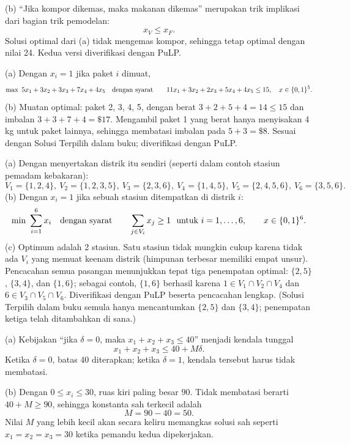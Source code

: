 (b) ``Jika kompor dikemas, maka makanan dikemas'' merupakan trik implikasi dari bagian trik pemodelan:
\[
x_V \leq x_F.
\]
Solusi optimal dari (a) tidak mengemas kompor, sehingga tetap optimal dengan nilai 24. Kedua versi diverifikasi dengan PuLP.


(a) Dengan $x_i = 1$ jika paket $i$ dimuat,
\[
\max\ 5x_1 + 3x_2 + 3x_3 + 7x_4 + 4x_5
\quad \mbox{dengan syarat}\quad \quad
11x_1 + 3x_2 + 2x_3 + 5x_4 + 4x_5 \leq 15,\quad x \in \{0,1\}^5.
\]
(b) Muatan optimal: paket 2, 3, 4, 5, dengan berat $3+2+5+4 = 14 \leq 15$ dan imbalan $3+3+7+4 = \$17$. Mengambil paket 1 yang berat hanya menyisakan 4\,kg untuk paket lainnya, sehingga membatasi imbalan pada $5+3 = \$8$. Sesuai dengan Solusi Terpilih dalam buku; diverifikasi dengan PuLP.


(a) Dengan menyertakan distrik itu sendiri (seperti dalam contoh stasiun pemadam kebakaran):
\[
V_1 = \{1,2,4\},\ V_2 = \{1,2,3,5\},\ V_3 = \{2,3,6\},\ V_4 = \{1,4,5\},\ V_5 = \{2,4,5,6\},\ V_6 = \{3,5,6\}.
\]
(b) Dengan $x_i = 1$ jika sebuah stasiun ditempatkan di distrik $i$:
\[
\min\ \sum_{i=1}^{6} x_i
\quad \mbox{dengan syarat}\quad \quad
\sum_{j \in V_i} x_j \geq 1 \ \mbox{ untuk } i = 1,\dots,6, \qquad x \in \{0,1\}^6.
\]
(c) Optimum adalah 2 stasiun. Satu stasiun tidak mungkin cukup karena tidak ada $V_i$ yang memuat keenam distrik (himpunan terbesar memiliki empat unsur). Pencacahan semua pasangan menunjukkan tepat tiga penempatan optimal: $\{2,5\}$, $\{3,4\}$, dan $\{1,6\}$; sebagai contoh, $\{1,6\}$ berhasil karena $1 \in V_1 \cap V_2 \cap V_4$ dan $6 \in V_3 \cap V_5 \cap V_6$. Diverifikasi dengan PuLP beserta pencacahan lengkap. (Solusi Terpilih dalam buku semula hanya mencantumkan $\{2,5\}$ dan $\{3,4\}$; penempatan ketiga telah ditambahkan di sana.)


(a) Kebijakan ``jika $\delta = 0$, maka $x_1 + x_2 + x_3 \leq 40$'' menjadi kendala tunggal
\[
x_1 + x_2 + x_3 \leq 40 + M\delta.
\]
Ketika $\delta = 0$, batas 40 diterapkan; ketika $\delta = 1$, kendala tersebut harus tidak membatasi.

(b) Dengan $0 \leq x_i \leq 30$, ruas kiri paling besar $90$. Tidak membatasi berarti $40 + M \geq 90$, sehingga konstanta sah terkecil adalah
\[
M = 90 - 40 = 50.
\]
Nilai $M$ yang lebih kecil akan secara keliru memangkas solusi sah seperti $x_1 = x_2 = x_3 = 30$ ketika pemandu kedua dipekerjakan.

